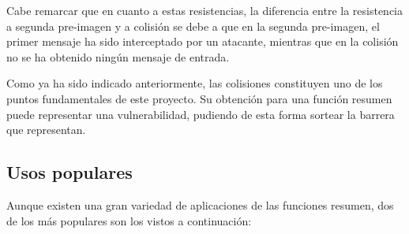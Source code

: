 \documentclass[12pt,spanish,listoffigures,listoftables,listofalgorithms]{tfgetsinf}
\begin{document}
Cabe remarcar que en cuanto a estas resistencias, la diferencia entre la resistencia a segunda pre-imagen y a colisión se debe a que en la segunda pre-imagen, el primer mensaje ha sido interceptado por un atacante, mientras que en la colisión no se ha obtenido ningún mensaje de entrada.

Como ya ha sido indicado anteriormente, las colisiones constituyen uno de los puntos fundamentales de este proyecto. Su obtención para una función resumen puede representar una vulnerabilidad, pudiendo de esta forma sortear la barrera que representan.

\subsection{Usos populares}

Aunque existen una gran variedad de aplicaciones de las funciones resumen, dos de los más populares son los vistos a continuación:
\end{document}
